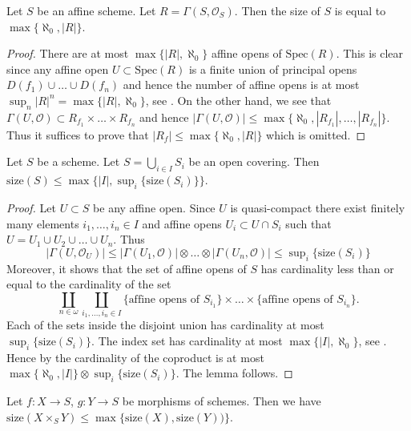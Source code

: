 \begin{lemma}
\label{lemma-bound-affine}
Let $S$ be an affine scheme.
Let $R = \Gamma(S, \mathcal{O}_S)$.
Then the size of $S$ is equal to $\max\{ \aleph_0, |R|\}$.
\end{lemma}

\begin{proof}
There are at most $\max\{|R|, \aleph_0\}$ affine opens of
$\text{Spec}(R)$. This is clear since any affine open
$U \subset \text{Spec}(R)$ is a finite union of principal
opens $D(f_1) \cup \ldots \cup D(f_n)$ and hence the number
of affine opens is at most $\sup_n |R|^n = \max\{|R|, \aleph_0\}$,
see \cite[Ch. I, 10.13]{Kunen}. On the other hand, we see that
$\Gamma(U, \mathcal{O}) \subset R_{f_1} \times \ldots \times R_{f_n}$
and hence $|\Gamma(U, \mathcal{O})| \leq
\max\{\aleph_0, |R_{f_1}|, \ldots, |R_{f_n}|\}$. Thus
it suffices to prove that $|R_f| \leq \max\{\aleph_0, |R|\}$
which is omitted.
\end{proof}

\begin{lemma}
\label{lemma-bound-size}
Let $S$ be a scheme. Let $S = \bigcup_{i \in I} S_i$ be
an open covering. Then
$\text{size}(S) \leq \max\{|I|, \sup_i\{\text{size}(S_i)\}\}$.
\end{lemma}

\begin{proof}
Let $U \subset S$ be any affine open. Since $U$ is quasi-compact
there exist finitely many elements $i_1, \ldots, i_n \in I$
and affine opens $U_i \subset U \cap S_i$ such that
$U = U_1 \cup U_2 \cup \ldots \cup U_n$. Thus
$$
|\Gamma(U, \mathcal{O}_U)|
\leq
|\Gamma(U_1, \mathcal{O})|
\otimes
\ldots
\otimes
|\Gamma(U_n, \mathcal{O})|
\leq \sup\nolimits_i\{\text{size}(S_i)\}
$$
Moreover, it shows that the set of affine opens of $S$ has
cardinality less than or equal to the cardinality of the set
$$
\coprod_{n \in \omega}
\coprod_{i_1, \ldots, i_n \in I}
\{\text{affine opens of }S_{i_1}\}
\times
\ldots
\times
\{\text{affine opens of }S_{i_n}\}.
$$
Each of the sets inside the disjoint union has cardinality at most
$\sup_i\{\text{size}(S_i)\}$. The index set has cardinality at most
$\max\{|I|, \aleph_0\}$, see \cite[Ch. I, 10.13]{Kunen}.
Hence by \cite[Lemma 5.8]{Jech} the cardinality
of the coproduct is at most $\max\{\aleph_0, |I|\}
\otimes \sup_i\{\text{size}(S_i)\}$. The lemma follows.
\end{proof}

\begin{lemma}
\label{lemma-bound-size-fibre-product}
Let $f : X \to S$, $g : Y \to S$ be morphisms of schemes.
Then we have
$\text{size}(X \times_S Y) \leq \max\{\text{size}(X), \text{size}(Y))\}$.
\end{lemma}

